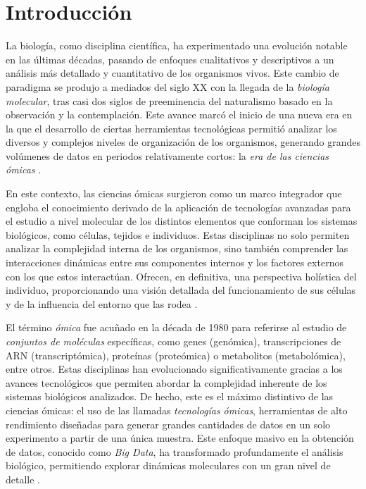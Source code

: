 \chapter{Introducción}

La biología, como disciplina científica, ha experimentado una evolución notable en las últimas décadas, 
pasando de enfoques cualitativos y descriptivos a un análisis más detallado y cuantitativo de los organismos 
vivos. Este cambio de paradigma se produjo a mediados del siglo XX con la llegada de la \textit{biología molecular},
tras casi dos siglos de preeminencia del naturalismo basado en la observación y la contemplación. 
Este avance marcó el inicio de una nueva era en la que el desarrollo de ciertas herramientas tecnológicas permitió 
analizar los diversos y complejos niveles de organización de los organismos, generando grandes volúmenes de datos 
en periodos relativamente cortos: la \textit{era de las ciencias ómicas} \cite{referencia-1, referencia-2}. \newline%

En este contexto, las ciencias ómicas surgieron como un marco integrador que engloba el conocimiento derivado 
de la aplicación de tecnologías avanzadas para el estudio a nivel molecular de los distintos elementos que 
conforman los sistemas biológicos, como células, tejidos e individuos. Estas disciplinas no solo permiten 
analizar la complejidad interna de los organismos, sino también comprender las interacciones dinámicas 
entre sus componentes internos y los factores externos con los que estos interactúan. Ofrecen, en definitiva,
una perspectiva holística del individuo, proporcionando una visión detallada del funcionamiento de sus células 
y de la influencia del entorno que las rodea \cite{referencia-2}. \newline%

El término \textit{ómica} fue acuñado en la década de 1980 para referirse al estudio de 
\textit{conjuntos de moléculas} específicas, como genes (genómica), transcripciones de ARN (transcriptómica), 
proteínas (proteómica) o metabolitos (metabolómica), entre otros. Estas disciplinas han evolucionado 
significativamente gracias a los avances tecnológicos que permiten abordar la complejidad inherente de los 
sistemas biológicos analizados. De hecho, este es el máximo distintivo de las ciencias ómicas: el uso de las 
llamadas \textit{tecnologías ómicas}, herramientas de alto rendimiento diseñadas para generar grandes cantidades 
de datos en un solo experimento a partir de una única muestra. Este enfoque masivo en la obtención de datos, 
conocido como \textit{Big Data}, ha transformado profundamente el análisis biológico, permitiendo explorar 
dinámicas moleculares con un gran nivel de detalle \cite{referencia-2}\cite{referencia-5}.\newline%

